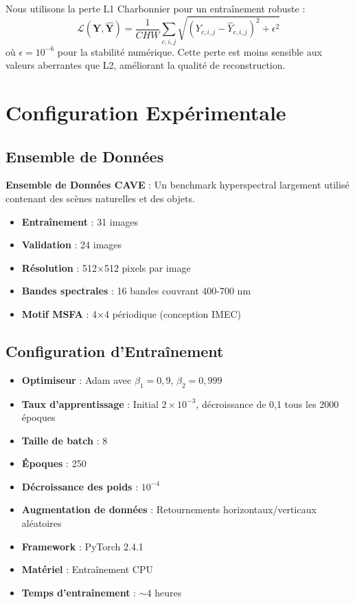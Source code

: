 \documentclass[conference]{IEEEtran}
\begin{document}
Nous utilisons la perte L1 Charbonnier pour un entraînement robuste :
\begin{equation}
\mathcal{L}(\mathbf{Y}, \hat{\mathbf{Y}}) = \frac{1}{CHW} \sum_{c,i,j} \sqrt{(Y_{c,i,j} - \hat{Y}_{c,i,j})^2 + \epsilon^2}
\end{equation}
où $\epsilon = 10^{-6}$ pour la stabilité numérique. Cette perte est moins sensible aux valeurs aberrantes que L2, améliorant la qualité de reconstruction.

\section{Configuration Expérimentale}

\subsection{Ensemble de Données}

\textbf{Ensemble de Données CAVE} \cite{b7} : Un benchmark hyperspectral largement utilisé contenant des scènes naturelles et des objets.
\begin{itemize}
    \item \textbf{Entraînement} : 31 images
    \item \textbf{Validation} : 24 images
    \item \textbf{Résolution} : 512×512 pixels par image
    \item \textbf{Bandes spectrales} : 16 bandes couvrant 400-700 nm
    \item \textbf{Motif MSFA} : 4×4 périodique (conception IMEC)
\end{itemize}

\subsection{Configuration d'Entraînement}

\begin{itemize}
    \item \textbf{Optimiseur} : Adam avec $\beta_1=0,9$, $\beta_2=0,999$
    \item \textbf{Taux d'apprentissage} : Initial $2 \times 10^{-3}$, décroissance de 0,1 tous les 2000 époques
    \item \textbf{Taille de batch} : 8
    \item \textbf{Époques} : 250
    \item \textbf{Décroissance des poids} : $10^{-4}$
    \item \textbf{Augmentation de données} : Retournements horizontaux/verticaux aléatoires
    \item \textbf{Framework} : PyTorch 2.4.1
    \item \textbf{Matériel} : Entraînement CPU
    \item \textbf{Temps d'entraînement} : $\sim$4 heures
\end{itemize}
\end{document}
